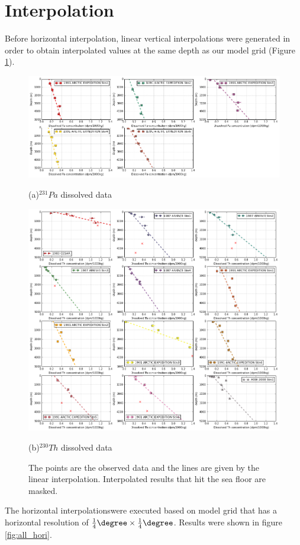 \documentclass[paper=a4, fontsize=11pt]{scrartcl} %
\numberwithin{equation}{section} %
\numberwithin{figure}{section} %
\numberwithin{table}{section} %
\begin{document}
\section{Interpolation}
Before horizontal interpolation, linear vertical interpolations were generated in order to obtain interpolated values at the same depth as our model grid (Figure \ref{fig:all_ver}). 

\begin{figure}[!h]
\centering
  \includegraphics[width=30pc]{Figures/Diss_Pa_all.pdf}
  \caption*{(a)$^{231}Pa$ dissolved data}
\centering  
  \includegraphics[width=30pc]{Figures/Diss_Th_all.pdf}
  \caption*{(b)$^{230}Th$ dissolved data}
\caption{The points are the observed data and the lines are given by the linear interpolation. Interpolated results that hit the sea floor are masked.}
 \label{fig:all_ver}
\end{figure}


The horizontal interpolations\footnotemark[5] were executed based on model grid that has a horizontal resolution of $\frac{1}{4}\degree\times\frac{1}{4}\degree$. Results were shown in figure \ref{fig:all_hori}.  
\end{document}
